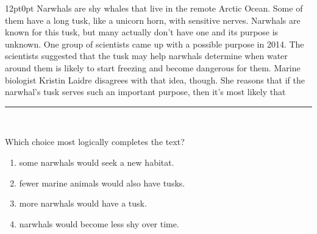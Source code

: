 \documentclass[11pt, twocolumn]{article}
\newcounter{questionnum}
\begin{document}
\vspace{6pt}\noindent
\begin{minipage}{\columnwidth}\raggedright
\noindent{}\par\vspace{8pt}
\begin{adjustwidth}{12pt}{0pt}
Narwhals are shy whales that live in the remote Arctic Ocean. Some of them have a long tusk, like a unicorn horn, with sensitive nerves. Narwhals are known for this tusk, but many actually don't have one and its purpose is unknown. One group of scientists came up with a possible purpose in 2014. The scientists suggested that the tusk may help narwhals determine when water around them is likely to start freezing and become dangerous for them. Marine biologist Kristin Laidre disagrees with that idea, though. She reasons that if the narwhal's tusk serves such an important purpose, then it's most likely that \,\rule{2cm}{0.4pt}\,
\vspace{6pt}

Which choice most logically completes the text?
\begin{enumerate}[label=\Alph*),leftmargin=18pt,topsep=3pt,itemsep=2pt]
  \item some narwhals would seek a new habitat.
  \item fewer marine animals would also have tusks.
  \item more narwhals would have a tusk.
  \item narwhals would become less shy over time.
\end{enumerate}
\end{adjustwidth}
\end{minipage}\par
\end{document}
